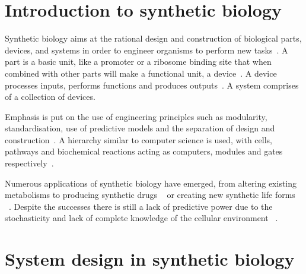 \section{Introduction to synthetic biology}

Synthetic biology aims at the rational design and construction of biological parts, devices, and systems in order to engineer organisms to perform new tasks~\autocite{Lu:2009ez,Andrianantoandro:2006bi}. A part is a basic unit, like a promoter or a ribosome binding site that when combined with other parts will make a functional unit, a device~\autocite{Heinemann:2006ht}. A device processes inputs, performs functions and produces outputs~\autocite{Andrianantoandro:2006bi}. A system comprises of a collection of devices.     

Emphasis is put on the use of engineering principles such as modularity, standardisation, use of predictive models and the separation of design and construction~\autocite{Agapakis:2009bt, Heinemann:2006ht}. A hierarchy similar to computer science is used, with cells, pathways and biochemical reactions acting as computers, modules and gates respectively~\autocite{Andrianantoandro:2006bi}. 
       
Numerous applications of synthetic biology have emerged, from altering existing metabolisms to producing synthetic drugs ~\autocite{Holtz:2010bm} or creating new synthetic life forms ~\autocite{Agapakis:2009bt}. Despite the successes there is still a lack of predictive power due to the stochasticity and lack of complete knowledge of the cellular environment ~\autocite{Andrianantoandro:2006bi}.

\section{System design in synthetic biology}

